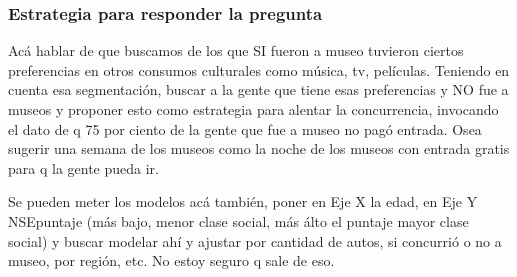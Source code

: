 \documentclass{beamer}
\begin{document}
\begin{frame}
\frametitle{Estrategia para responder la pregunta}

Acá hablar de que buscamos de los que SI fueron a museo tuvieron ciertos preferencias en otros consumos culturales como música, tv, películas. 
Teniendo en cuenta esa segmentación, buscar a la gente que tiene esas preferencias y NO fue a museos y proponer esto como estrategia para alentar la concurrencia, invocando el dato de q 75 por ciento  de la gente que fue a museo no pagó entrada. 
Osea sugerir una semana de los museos como la noche de los museos con entrada gratis para q la gente pueda ir.

Se pueden meter los modelos acá también, poner en Eje X la edad, en Eje Y NSEpuntaje (más bajo, menor clase social, más álto el puntaje mayor clase social) y buscar modelar ahí y ajustar por cantidad de autos, si concurrió o no a museo, por región, etc. No estoy seguro q sale de eso.

\end{frame}
\end{document}
